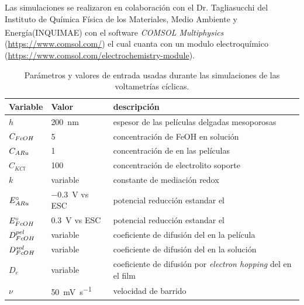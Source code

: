 	 	
	 		\pagebreak	
			
			 Las simulaciones se realizaron en colaboración con el Dr. Tagliasucchi del Instituto de Química Física de los Materiales, Medio Ambiente y Energía\linebreak  (INQUIMAE) con el software \textit{COMSOL Multiphysics\textsuperscript\textregistered} (\url{https://www.comsol.com/}) el cual cuanta con un modulo electroquímico (\url{https://www.comsol.com/electrochemistry-module}).

	    	\begin{table}[hb!]
	 	    \caption[Parámetros de las simulaciones]{Parámetros y valores de entrada usadas durante las simulaciones de las voltametrías cíclicas.}
	 	    \begin{tabular}{>{\raggedright\arraybackslash}m{1.4cm}>{\centering\arraybackslash}m{2.8cm}>{\raggedright\arraybackslash}m{6.7cm}} 
	 	    \toprule
	 	    Variable  & 	Valor  &   descripción      \\ \midrule
	 	    $h$  	  &  \hspace{-5mm} \SI{200}{nm}	& 	   espesor de las películas delgadas mesoporosas 	    \\ \midrule
	 	    $C_{\fc}$  & \SI{5}{\milli\Molar}  & concentración de FeOH en solución    \\ \midrule
	 	    $C_{\ru}$ & \SI{1}{\milli\Molar}  & concentración de \ru\space en las películas    \\ \midrule
	 	    $C_{KCl}$ & \hspace{-5mm}  \SI{100}{\milli\Molar}  & concentración de electrolito soporte    \\ \midrule
	 	    $k$ 		   & variable 	 & 	constante de mediación redox    \\ \midrule
	 	    $E^\circ_{\ru}$  & \hspace{-3mm}\SI{-0.3}{\volt} vs ESC & potencial reducción estandar el \ru \\ \midrule
	 	    $E^\circ_{\fc}$  & \SI{0.3}{\volt} vs ESC & potencial reducción estandar el \fc \\ \midrule
	 	    $D_{\fc}^{pel} $  & variable & coeficiente de difusión del \fc\space en la película \\ \midrule
	 	    $D_{\fc}^{sol} $  & variable & coeficiente de difusión del \fc\space en la solución \\ \midrule
	 	    $D_{e}$  & variable & coeficiente de difusión por \textit{electron hopping }del \ru\space en el film \\ \midrule
	 	    $\nu$    & \hspace{3.5mm} \SI{50}{\milli\volt\per\second}  &  velocidad de barrido \\
	 	     \bottomrule
			\end{tabular}
			\label{tabla:simulacion}
			\end{table} 

